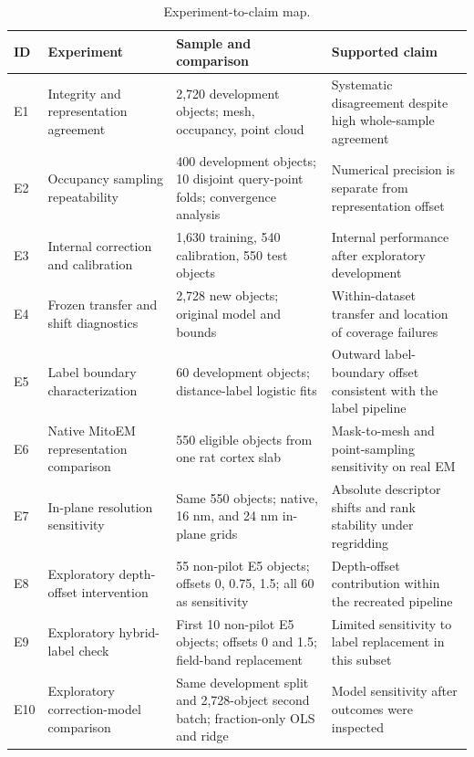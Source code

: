 \documentclass[journal]{IEEEtran}
\begin{document}
\begin{table}[!t]
\caption{Experiment-to-claim map.}
\label{tab:III}
\centering
\footnotesize
\setlength{\tabcolsep}{4pt}
\renewcommand{\arraystretch}{1.15}
\begin{tabularx}{\textwidth}{p{} Y Y Y}
\toprule
\textbf{ID} & \textbf{Experiment} & \textbf{Sample and comparison} & \textbf{Supported claim} \\
\midrule
E1 & Integrity and representation agreement & 2,720 development objects; mesh, occupancy, point cloud & Systematic disagreement despite high whole-sample agreement \\
E2 & Occupancy sampling repeatability & 400 development objects; 10 disjoint query-point folds; convergence analysis & Numerical precision is separate from representation offset \\
E3 & Internal correction and calibration & 1,630 training, 540 calibration, 550 test objects & Internal performance after exploratory development \\
E4 & Frozen transfer and shift diagnostics & 2,728 new objects; original model and bounds & Within-dataset transfer and location of coverage failures \\
E5 & Label boundary characterization & 60 development objects; distance-label logistic fits & Outward label-boundary offset consistent with the label pipeline \\
E6 & Native MitoEM representation comparison & 550 eligible objects from one rat cortex slab & Mask-to-mesh and point-sampling sensitivity on real EM \\
E7 & In-plane resolution sensitivity & Same 550 objects; native, 16 nm, and 24 nm in-plane grids & Absolute descriptor shifts and rank stability under regridding \\
E8 & Exploratory depth-offset intervention & 55 non-pilot E5 objects; offsets 0, 0.75, 1.5; all 60 as sensitivity & Depth-offset contribution within the recreated pipeline \\
E9 & Exploratory hybrid-label check & First 10 non-pilot E5 objects; offsets 0 and 1.5; field-band replacement & Limited sensitivity to label replacement in this subset \\
E10 & Exploratory correction-model comparison & Same development split and 2,728-object second batch; fraction-only OLS and ridge & Model sensitivity after outcomes were inspected \\

\bottomrule\end{tabularx}\end{table}
\end{document}
